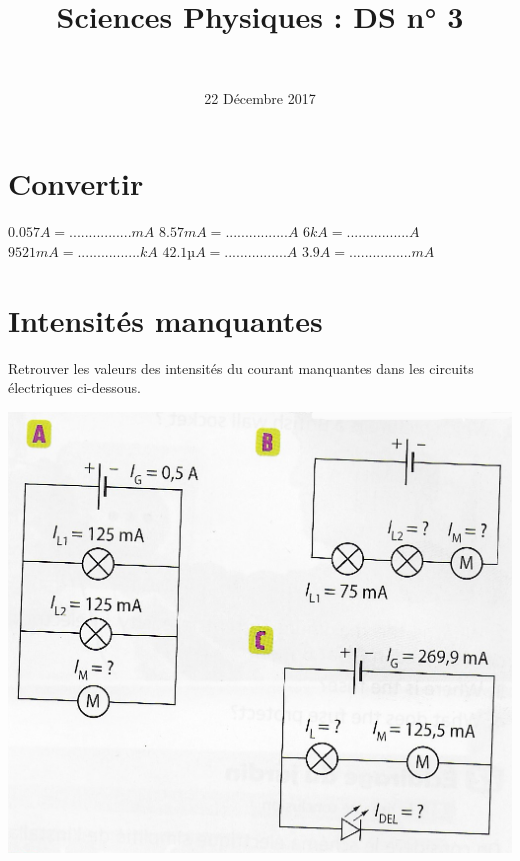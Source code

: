 \documentclass[a4paper,11pt]{exam}
\author{\ }
\date{22 Décembre 2017}
\title{Sciences Physiques : DS n° 3}
\begin{document}
%	

	\maketitle
\vspace*{-0.5cm}	


%

\section{Convertir}

\begin{questions}
	\begin{multicols}{3}
		
	\question $\num{0.057} A = ................ mA$
	\question $\num{8.57} mA = ................ A$
	\question $\num{6} kA = ................ A$
	\question $\num{9521} mA = ................ kA$
	\question $\num{42.1} µA = ................ A$
	\question $\num{3.9} A = ................ mA$
	
	\end{multicols}
	
\end{questions}



\newpage 

%



\section{Intensités manquantes}

Retrouver les valeurs des intensités du courant manquantes dans les circuits électriques ci-dessous. 

\begin{center}
	\includegraphics[scale=1]{img/circuits}
\end{center}


\fillwithdottedlines{4.5cm}









\ \label{LastPage}
\end{document}
